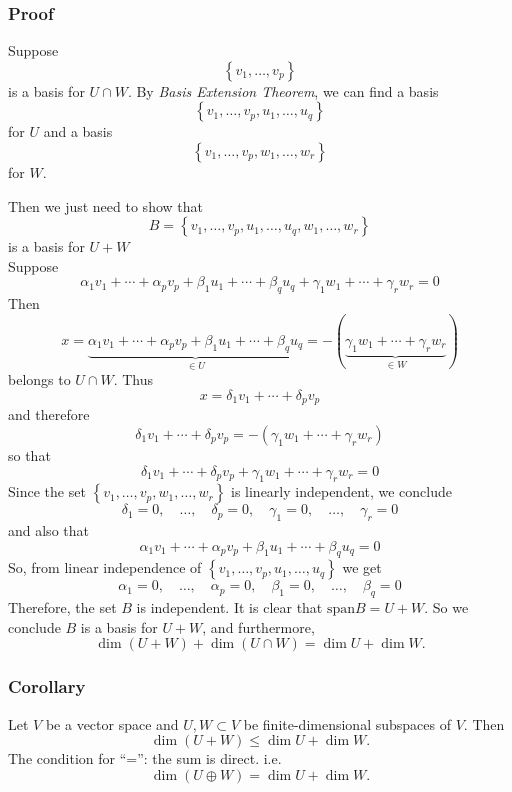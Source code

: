 \documentclass{beamer}
\renewcommand{\emph}[1]{{\color{Turquoise3}\textsl{#1}}}
\begin{document}
\begin{frame}[allowframebreaks]
    \frametitle{Proof}
    Suppose $$\left\{v_{1}, \ldots, v_{p}\right\}$$ is a basis for $U \cap W$.
    By \emph{Basis Extension Theorem}, we can find a basis
    $$\left\{v_{1}, \ldots, v_{p}, u_{1}, \ldots, u_{q}\right\}$$ for $U$ and a basis
    $$\left\{v_{1}, \ldots, v_{p}, w_{1}, \ldots, w_{r}\right\}$$ for $W$.

    Then we just need to show that $$B=\left\{v_{1}, \ldots, v_{p}, u_{1}, \ldots, u_{q}, w_{1}, \ldots, w_{r}\right\}$$ is a basis for $U+W$\\
    \newpage
    Suppose
    $$
        \alpha_{1} v_{1}+\cdots+\alpha_{p} v_{p}+\beta_{1} u_{1}+\cdots+\beta_{q} u_{q}+\gamma_{1} w_{1}+\cdots+\gamma_{r} w_{r}=0
    $$
    Then
    $$
        x=\underbrace{\alpha_{1} v_{1}+\cdots+\alpha_{p} v_{p}+\beta_{1} u_{1}+\cdots+\beta_{q} u_{q}}_{\in U}=-(\underbrace{\gamma_{1} w_{1}+\cdots+\gamma_{r} w_{r}}_{\in W})
    $$
    belongs to $U \cap W$. Thus
    $$
        x=\delta_{1} v_{1}+\cdots+\delta_{p} v_{p}
    $$
    and therefore
    $$
        \delta_{1} v_{1}+\cdots+\delta_{p} v_{p}=-\left(\gamma_{1} w_{1}+\cdots+\gamma_{r} w_{r}\right)
    $$
    so that
    $$
        \delta_{1} v_{1}+\cdots+\delta_{p} v_{p}+\gamma_{1} w_{1}+\cdots+\gamma_{r} w_{r}=0
    $$
    Since the set $\left\{v_{1}, \ldots, v_{p}, w_{1}, \ldots, w_{r}\right\}$ is linearly independent, we conclude
    $$
        \delta_{1}=0, \quad \ldots, \quad \delta_{p}=0, \quad \gamma_{1}=0, \quad \ldots, \quad \gamma_{r}=0
    $$
    and also that
    $$
        \alpha_{1} v_{1}+\cdots+\alpha_{p} v_{p}+\beta_{1} u_{1}+\cdots+\beta_{q} u_{q}=0
    $$
    So, from linear independence of $\left\{v_{1}, \ldots, v_{p}, u_{1}, \ldots, u_{q}\right\}$ we get
    $$
        \alpha_{1}=0, \quad \ldots, \quad \alpha_{p}=0, \quad \beta_{1}=0, \quad \ldots, \quad \beta_{q}=0
    $$
    Therefore, the set $B$ is independent. It is clear that $\text{span} B=U+W$. So we conclude $B$ is a basis for $U+W$, and furthermore,
    \[\dim(U+W)+\dim(U\cap W)=\dim U+\dim W.\]
\end{frame}

\begin{frame}
    \frametitle{Corollary}
    Let $V$ be a vector space and $U,W\subset V$ be finite-dimensional subspaces of $V$. Then
    \[\dim(U+W)\leq\dim U+\dim W.\]
    The condition for ``='': the sum is direct. i.e.
    \[\dim(U\oplus W)=\dim U+\dim W.\]
\end{frame}
\end{document}
